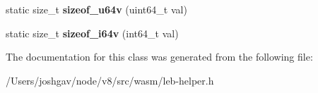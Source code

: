 \begin{DoxyCompactItemize}
\item 
static size\+\_\+t {\bfseries sizeof\+\_\+u64v} (uint64\+\_\+t val)\hypertarget{classv8_1_1internal_1_1wasm_1_1_l_e_b_helper_abed11129ef84573c009ab5b02b8ce80c}{}\label{classv8_1_1internal_1_1wasm_1_1_l_e_b_helper_abed11129ef84573c009ab5b02b8ce80c}

\item 
static size\+\_\+t {\bfseries sizeof\+\_\+i64v} (int64\+\_\+t val)\hypertarget{classv8_1_1internal_1_1wasm_1_1_l_e_b_helper_a04cf5f27e8487bfdb67ab7bf1bd8ac6c}{}\label{classv8_1_1internal_1_1wasm_1_1_l_e_b_helper_a04cf5f27e8487bfdb67ab7bf1bd8ac6c}

\end{DoxyCompactItemize}


The documentation for this class was generated from the following file\+:\begin{DoxyCompactItemize}
\item 
/\+Users/joshgav/node/v8/src/wasm/leb-\/helper.\+h\end{DoxyCompactItemize}
